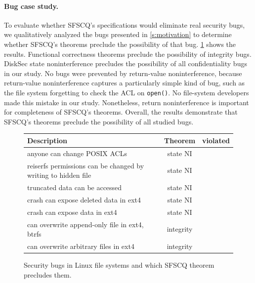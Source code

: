 \paragraph{Bug case study.}

To evaluate whether SFSCQ's specifications would eliminate real
security bugs, we qualitatively analyzed the bugs presented in
\ref{s:motivation} to determine whether SFSCQ's theorems preclude
the possibility of that bug.  \ref{fig:bugs-addressed} shows the
results.  Functional correctness theorems preclude the possibility of
integrity bugs.  DiskSec state noninterference precludes the possibility
of all confidentiality bugs in our study.  No bugs were prevented by
return-value noninterference, because return-value noninterference captures a
particularly simple kind of bug, such as the file system forgetting
to check the ACL on \texttt{open()}.  No file-system developers made this
mistake in our study.  Nonetheless, return noninterference is important
for completeness of SFSCQ's theorems.  Overall, the results demonstrate
that SFSCQ's theorems preclude the possibility of all studied bugs.

\begin{figure}[H]
  \centering
  \small
  \begin{tabular}{| l | c | c |}
    \hline
    \textbf{Description} & \textbf{Theorem}  & \textbf{violated}\\
    \hline
    anyone can change POSIX ACLs~\cite{CVE-2010-2071, CVE-2010-1641, CVE-2016-1237} & state NI & \\
    reiserfs permissions can be changed by writing to hidden file~\cite{CVE-2010-1146} & state NI & \\
    truncated data can be accessed~\cite{CVE-2015-8374} & state NI  &\\
    crash can expose deleted data in ext4~\cite{CVE-2017-7495} & state NI  &\\
    crash can expose data in ext4~\cite{git:469017} & state NI  &\\
    can overwrite append-only file in ext4, btrfs~\cite{CVE-2010-2066, CVE-2010-2537} & integrity  &\\
    can overwrite arbitrary files in ext4~\cite{CVE-2009-4131} & integrity & \\
    \hline
  \end{tabular}
  \caption{Security bugs in Linux file systems and which SFSCQ theorem precludes them.}
  \label{fig:bugs-addressed}
\end{figure}


